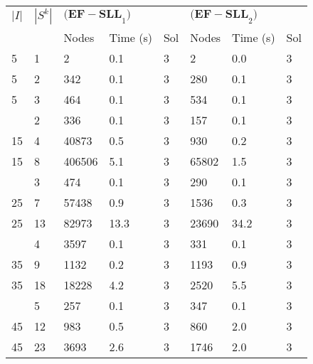 
\begin{tabularx}{\textwidth}{ll *{6}{Y}}
    \toprule
    $|I|$ & $|S^k|$
        & & \\
    \cmidrule(lr){3-5} \cmidrule(lr){6-8}
    & & Nodes & Time (s) & Sol & Nodes & Time (s) & Sol\\
     & 1 & 2 & 0.1 & 3 & 2 & 0.0 & 3\\
    5 & 2 & 342 & 0.1 & 3 & 280 & 0.1 & 3\\
    5 & 3 & 464 & 0.1 & 3 & 534 & 0.1 & 3\\
     & 2 & 336 & 0.1 & 3 & 157 & 0.1 & 3\\
    15 & 4 & 40873 & 0.5 & 3 & 930 & 0.2 & 3\\
    15 & 8 & 406506 & 5.1 & 3 & 65802 & 1.5 & 3\\
     & 3 & 474 & 0.1 & 3 & 290 & 0.1 & 3\\
    25 & 7 & 57438 & 0.9 & 3 & 1536 & 0.3 & 3\\
    25 & 13 & 82973 & 13.3 & 3 & 23690 & 34.2 & 3\\
     & 4 & 3597 & 0.1 & 3 & 331 & 0.1 & 3\\
    35 & 9 & 1132 & 0.2 & 3 & 1193 & 0.9 & 3\\
    35 & 18 & 18228 & 4.2 & 3 & 2520 & 5.5 & 3\\
     & 5 & 257 & 0.1 & 3 & 347 & 0.1 & 3\\
    45 & 12 & 983 & 0.5 & 3 & 860 & 2.0 & 3\\
    45 & 23 & 3693 & 2.6 & 3 & 1746 & 2.0 & 3\\
    \bottomrule
\end{tabularx}
